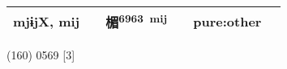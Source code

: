 \documentclass[14pt,a4paper]{scrartcl}
\begin{document}
\begin{longtable}[c]{@{}llllll@{}}
\begin{minipage}[t]{0.14\columnwidth}
mjɨjX, mij
\strut\end{minipage} &
\begin{minipage}[t]{0.14\columnwidth}\raggedright\strut
\strut\end{minipage} &
\begin{minipage}[t]{0.14\columnwidth}\raggedright\strut
楣\textsuperscript{6963~mij}
\strut\end{minipage} &
\begin{minipage}[t]{0.14\columnwidth}\raggedright\strut
\strut\end{minipage} &
\begin{minipage}[t]{0.14\columnwidth}\raggedright\strut
pure:other
\strut\end{minipage}\tabularnewline
\bottomrule
\end{longtable}

(160) 0569 {[}3{]}
\end{document}
